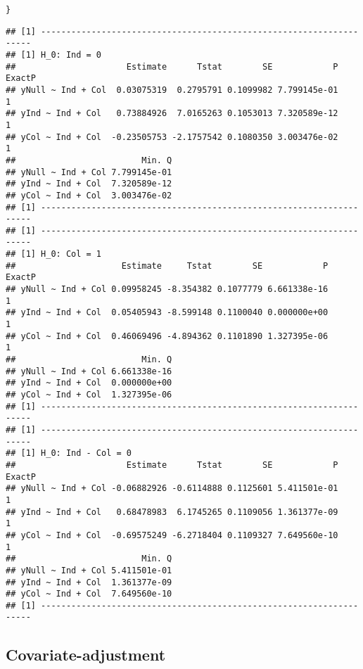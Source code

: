 \documentclass[11pt, a4paper]{article}\usepackage[]{graphicx}\usepackage[]{color}
\makeatletter
\newcommand{\hlstd}[1]{\textcolor[rgb]{0.345,0.345,0.345}{#1}}%
\newenvironment{kframe}{%
 \def\at@end@of@kframe{}%
 \ifinner\ifhmode%
  \def\at@end@of@kframe{\end{minipage}}%
  \begin{minipage}{\columnwidth}%
 \fi\fi%
 \def\FrameCommand##1{\hskip\@totalleftmargin \hskip-\fboxsep
 \colorbox{shadecolor}{##1}\hskip-\fboxsep
     \hskip-\linewidth \hskip-\@totalleftmargin \hskip\columnwidth}%
 \MakeFramed {\advance\hsize-\width
   \@totalleftmargin\z@ \linewidth\hsize
   \@setminipage}}%
 {\par\unskip\endMakeFramed%
 \at@end@of@kframe}
\newenvironment{knitrout}{}{} %
\makeatother
\begin{document}
\begin{knitrout}
\begin{kframe}
\begin{alltt}
    \hlstd{\}}
\end{alltt}
\begin{verbatim}
## [1] --------------------------------------------------------------------
## [1] H_0: Ind = 0
##                      Estimate      Tstat        SE            P ExactP
## yNull ~ Ind + Col  0.03075319  0.2795791 0.1099982 7.799145e-01      1
## yInd ~ Ind + Col   0.73884926  7.0165263 0.1053013 7.320589e-12      1
## yCol ~ Ind + Col  -0.23505753 -2.1757542 0.1080350 3.003476e-02      1
##                         Min. Q
## yNull ~ Ind + Col 7.799145e-01
## yInd ~ Ind + Col  7.320589e-12
## yCol ~ Ind + Col  3.003476e-02
## [1] --------------------------------------------------------------------
## [1] --------------------------------------------------------------------
## [1] H_0: Col = 1
##                     Estimate     Tstat        SE            P ExactP
## yNull ~ Ind + Col 0.09958245 -8.354382 0.1077779 6.661338e-16      1
## yInd ~ Ind + Col  0.05405943 -8.599148 0.1100040 0.000000e+00      1
## yCol ~ Ind + Col  0.46069496 -4.894362 0.1101890 1.327395e-06      1
##                         Min. Q
## yNull ~ Ind + Col 6.661338e-16
## yInd ~ Ind + Col  0.000000e+00
## yCol ~ Ind + Col  1.327395e-06
## [1] --------------------------------------------------------------------
## [1] --------------------------------------------------------------------
## [1] H_0: Ind - Col = 0
##                      Estimate      Tstat        SE            P ExactP
## yNull ~ Ind + Col -0.06882926 -0.6114888 0.1125601 5.411501e-01      1
## yInd ~ Ind + Col   0.68478983  6.1745265 0.1109056 1.361377e-09      1
## yCol ~ Ind + Col  -0.69575249 -6.2718404 0.1109327 7.649560e-10      1
##                         Min. Q
## yNull ~ Ind + Col 5.411501e-01
## yInd ~ Ind + Col  1.361377e-09
## yCol ~ Ind + Col  7.649560e-10
## [1] --------------------------------------------------------------------
\end{verbatim}
\end{kframe}
\end{knitrout}

    \subsection{Covariate-adjustment}
\end{document}
